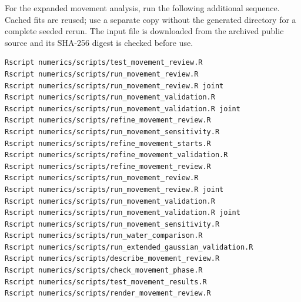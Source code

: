 \documentclass[11pt]{article}
\begin{document}
For the expanded movement analysis, run the following additional sequence.
Cached fits are reused; use a separate copy without the generated
 directory for a complete seeded rerun.
The input file is downloaded from the archived public source and its
SHA-256 digest is checked before use.
\begin{verbatim}
Rscript numerics/scripts/test_movement_review.R
Rscript numerics/scripts/run_movement_review.R
Rscript numerics/scripts/run_movement_review.R joint
Rscript numerics/scripts/run_movement_validation.R
Rscript numerics/scripts/run_movement_validation.R joint
Rscript numerics/scripts/refine_movement_review.R
Rscript numerics/scripts/run_movement_sensitivity.R
Rscript numerics/scripts/refine_movement_starts.R
Rscript numerics/scripts/refine_movement_validation.R
Rscript numerics/scripts/refine_movement_review.R
Rscript numerics/scripts/run_movement_review.R
Rscript numerics/scripts/run_movement_review.R joint
Rscript numerics/scripts/run_movement_validation.R
Rscript numerics/scripts/run_movement_validation.R joint
Rscript numerics/scripts/run_movement_sensitivity.R
Rscript numerics/scripts/run_water_comparison.R
Rscript numerics/scripts/run_extended_gaussian_validation.R
Rscript numerics/scripts/describe_movement_review.R
Rscript numerics/scripts/check_movement_phase.R
Rscript numerics/scripts/test_movement_results.R
Rscript numerics/scripts/render_movement_review.R
\end{verbatim}
\end{document}
